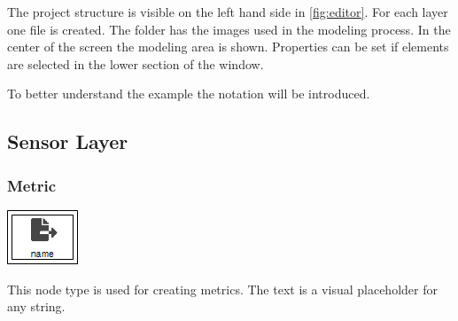 The project structure is visible on the left hand side in \cref{fig:editor}. For each layer one file is created. The  folder has the images used in the modeling process. In the center of the screen the modeling area is shown. Properties can be set if elements are selected in the lower section of the window.

To better understand the example the notation will be introduced.

\subsection{Sensor Layer}

\subsubsection{Metric}
\noindent\begin{minipage}{0.15\textwidth}%
	\includegraphics[width=\linewidth]{assets/images/metric}
\end{minipage}%
\hfill%
\begin{minipage}{0.8\textwidth}
	This node type is used for creating metrics. The text  is a visual placeholder for any string.
\end{minipage}


